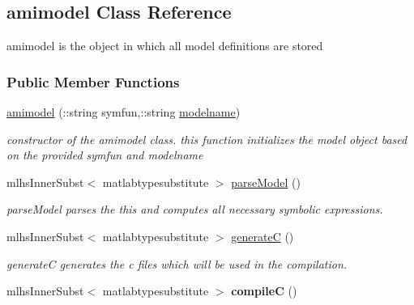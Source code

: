 \hypertarget{classamimodel}{}\subsection{amimodel Class Reference}
\label{classamimodel}


amimodel is the object in which all model definitions are stored  


\subsubsection*{Public Member Functions}
\begin{DoxyCompactItemize}
\item 
\hyperlink{classamimodel_a05d52506788717b3d482845748446a60}{amimodel} (\+::string symfun,\+::string \hyperlink{classamimodel_a71bca9c21a6de42d8079ade31cb61044}{modelname})
\begin{DoxyCompactList}\small\item\em constructor of the amimodel class. this function initializes the model object based on the provided symfun and modelname \end{DoxyCompactList}\item 
mlhs\+Inner\+Subst$<$ matlabtypesubstitute $>$ \hyperlink{classamimodel_a68efdc6ed5d618672bea1556209e5568}{parse\+Model} ()
\begin{DoxyCompactList}\small\item\em parse\+Model parses the this and computes all necessary symbolic expressions. \end{DoxyCompactList}\item 
mlhs\+Inner\+Subst$<$ matlabtypesubstitute $>$ \hyperlink{classamimodel_af2ce5001c2320c95471ecb8c3d73bdbb}{generate\+C} ()
\begin{DoxyCompactList}\small\item\em generate\+C generates the c files which will be used in the compilation. \end{DoxyCompactList}\item 
\hypertarget{classamimodel_ad1339463ebc3a2e6c6aeda6f63f1b4ed}{}mlhs\+Inner\+Subst$<$ matlabtypesubstitute $>$ {\bfseries compile\+C} ()\label{classamimodel_ad1339463ebc3a2e6c6aeda6f63f1b4ed}


\end{DoxyCompactItemize}
